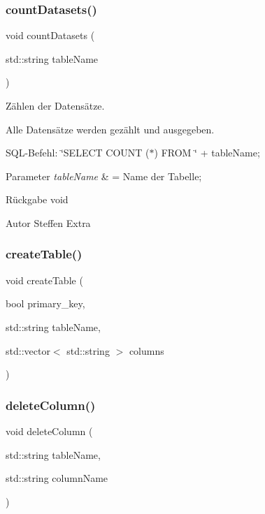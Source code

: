 \subsubsection{count\+Datasets()}
{\footnotesize\ttfamily void count\+Datasets (\begin{DoxyParamCaption}\item[{std\+::string}]{table\+Name }\end{DoxyParamCaption})}



Zählen der Datensätze. 

Alle Datensätze werden gezählt und ausgegeben.~\newline


S\+Q\+L-\/\+Befehl\+: \char`\"{}\+S\+E\+L\+E\+C\+T C\+O\+U\+N\+T ($\ast$) F\+R\+O\+M \char`\"{} + table\+Name;


\begin{DoxyParams}{Parameter}
{\em table\+Name} & = Name der Tabelle;\\
\hline
\end{DoxyParams}
\begin{DoxyReturn}{Rückgabe}
void
\end{DoxyReturn}
\begin{DoxyAuthor}{Autor}
Steffen Extra 
\end{DoxyAuthor}
\mbox{\label{tables_8hpp_a018659fc814b4a097c4b4862f42fe554}} 
\subsubsection{create\+Table()}
{\footnotesize\ttfamily void create\+Table (\begin{DoxyParamCaption}\item[{bool}]{primary\+\_\+key,  }\item[{std\+::string}]{table\+Name,  }\item[{std\+::vector$<$ std\+::string $>$}]{columns }\end{DoxyParamCaption})}

\mbox{\label{tables_8hpp_aa3b10ab46a5fb3caa76745e084685e76}} 
\subsubsection{delete\+Column()}
{\footnotesize\ttfamily void delete\+Column (\begin{DoxyParamCaption}\item[{std\+::string}]{table\+Name,  }\item[{std\+::string}]{column\+Name }\end{DoxyParamCaption})}



